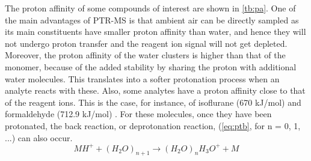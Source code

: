 The proton affinity of some compounds of interest are shown in \autoref{tb:pa}. One of the main advantages of PTR-MS is that ambient air can be directly sampled as its main constituents have smaller proton affinity than water, %
and hence they will not undergo proton transfer and the reagent ion signal will not get depleted.
Moreover, the proton affinity of the water clusters is higher than that of the monomer, because of the added stability by sharing the proton with additional water molecules.
This translates into a softer protonation process when an analyte reacts with these. 
%
Also, some analytes have a proton affinity close to that of the reagent ions.
This is the case, for instance, of isoflurane (670 kJ/mol) and formaldehyde (712.9 kJ/mol) \cite{ISOF_paper}.
For these molecules, once they have been protonated,  the back reaction, or deprotonation reaction, (\autoref{eq:ptb}, for n = 0, 1, ...) can also occur.
\begin{equation}
\label{eq:ptb}
MH^+ + (H_2O)_{n+1} \rightarrow (H_2O)_{n}H_3O^+ + M
\end{equation}




